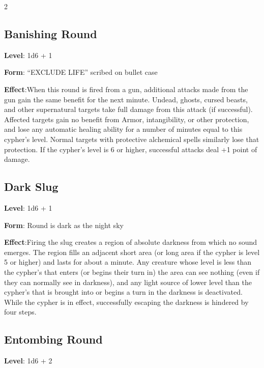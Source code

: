 \begin{multicols}{2}
\subsection{Banishing Round}

\textbf{Level}: 1d6 + 1 

\textbf{Form}: “EXCLUDE LIFE” scribed on bullet case 

\textbf{Effect}:When this round is fired from a gun, additional attacks made from the gun gain the same benefit for the next minute. Undead, ghosts, cursed beasts, and other supernatural targets take full damage from this attack (if successful). Affected targets gain no benefit from Armor, intangibility, or other protection, and lose any automatic healing ability for a number of minutes equal to this cypher’s level. Normal targets with protective alchemical spells similarly lose that protection. If the cypher’s level is 6 or higher, successful attacks deal +1 point of damage.

\subsection{Dark Slug} 

\textbf{Level}: 1d6 + 1 

\textbf{Form}: Round is dark as the night sky 

\textbf{Effect}:Firing the slug creates a region of absolute darkness from which no sound emerges. The region fills an adjacent short area (or long area if the cypher is level 5 or higher) and lasts for about a minute. 
Any creature whose level is less than the cypher’s that enters (or begins their turn in) the area can see nothing (even if they can normally see in darkness), and any light source of lower level than the cypher’s that is brought into or begins a turn in the darkness is deactivated. While the cypher is in effect, successfully escaping the darkness is hindered by four steps.

\subsection{Entombing Round}

\textbf{Level}: 1d6 + 2 


\end{multicols}
